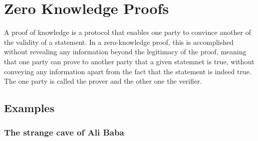 \chapter{Zero Knowledge Proofs}
\label{zkp}

A proof of knowledge is a protocol that enables one party to convince another of the validity of a statement.
In a zero-knowledge proof, this is accomplished without revealing any information beyond the legitimacy of the proof\cite{kiagias:crypto},
meaning that one party can prove to another party that a given statemnet is true, without conveying any information apart from
the fact that the statement is indeed true\cite{wiki:zkp}. The one party is called the prover and the other one the verifier.

\section{Examples}

\begin{figure*}[t!]
  \centering
\end{figure*}

\subsection{The strange cave of Ali Baba}
